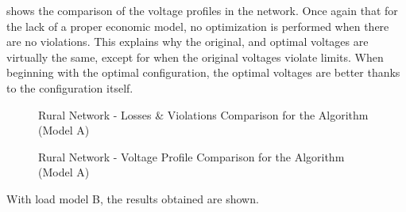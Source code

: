  shows the comparison of the voltage profiles in the network. Once again that for the lack of a proper economic model, no optimization is performed when there are no violations. This explains why the original, and optimal voltages are virtually the same, except for when the original voltages violate limits. When beginning with the optimal configuration, the optimal voltages are better thanks to the configuration itself.

\begin{figure}[H]
\begin{minipage}[!h]{.5\textwidth}
	\centering
    \setlength\figureheight{5cm}
    \setlength\figurewidth{6cm}
	
\end{minipage}
\begin{minipage}[!h]{.5\textwidth}
	\centering
	\setlength\figureheight{5cm}
    \setlength\figurewidth{6cm}
	
\end{minipage}
\caption{Rural Network - Losses \& Violations Comparison for the Algorithm (Model A)}
\end{figure}

\begin{figure}[H]
\begin{minipage}[!h]{.5\textwidth}
	\centering
    \setlength\figureheight{5cm}
    \setlength\figurewidth{6cm}
	
\end{minipage}
\begin{minipage}[!h]{.5\textwidth}
	\centering
	\setlength\figureheight{5cm}
    \setlength\figurewidth{6cm}
	
\end{minipage}
\caption{Rural Network - Voltage Profile Comparison for the Algorithm (Model A)}
\end{figure}

With load model B, the results obtained are shown.

